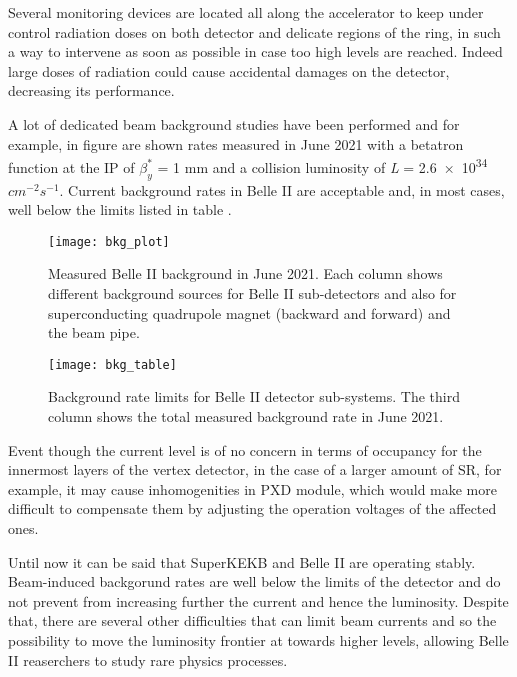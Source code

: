 Several monitoring devices are located all along the accelerator to keep under control radiation doses on both detector and delicate regions of the ring, in such a way to intervene as soon as possible in case too high levels are reached. Indeed large doses of radiation could cause accidental damages on the detector, decreasing its performance.

A lot of dedicated beam background studies have been performed and for example, in figure  are shown rates measured in June 2021 with a betatron function at the IP of $\beta_{y}^{*}$ = 1 mm and a collision luminosity of \textit{L} = \num{2.6e34} $cm^{-2} s^{-1}$. Current background rates in Belle II are acceptable and, in most cases, well below the limits listed in table .\\

\begin{figure}[h!]
\centering
\texttt{[image: bkg\_plot]}
\caption{Measured Belle II background in June 2021. Each column shows different background sources for Belle II sub-detectors and also for superconducting quadrupole magnet (backward and forward) and the beam pipe.}
\label{fig:bkg_plot}
\end{figure}


\begin{figure}[h!]
\centering
\texttt{[image: bkg\_table]}
\caption{Background rate limits for Belle II detector sub-systems. The third column shows the total measured background rate in June 2021.}
\label{fig:bkg_table}
\end{figure}

Event though the current level is of no concern in terms of occupancy for the innermost layers of the vertex detector, in the case of a larger amount of SR, for example, it may cause inhomogenities in PXD module, which would make more difficult to compensate them by adjusting the operation voltages of the affected ones.

Until now it can be said that SuperKEKB and Belle II are operating stably. Beam-induced backgorund rates are well below the limits of the detector and do not prevent from increasing further the current and hence the luminosity.  
Despite that, there are several other difficulties that can limit beam currents and so the possibility to move the luminosity frontier at towards higher levels, allowing Belle II reaserchers to study rare physics processes. 



